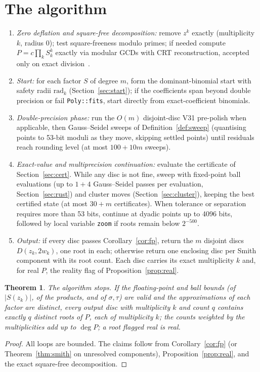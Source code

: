 \documentclass[10pt,a4paper]{article}
\newtheorem{theorem}{Theorem}[section]
\theoremstyle{definition}
\numberwithin{equation}{section}
\begin{document}
\section{The algorithm}\label{sec:algo}
\begin{enumerate}
\item \emph{Zero deflation and square-free decomposition:} remove $z^k$ exactly (multiplicity $k$, radius $0$); test square-freeness modulo primes; if needed compute $P=c\prod_k S_k^k$ exactly via modular GCDs with CRT reconstruction, accepted only on exact division~\cite{g5,g6}.
\item \emph{Start:} for each factor $S$ of degree $m$, form the dominant-binomial start with safety radii $\mathrm{rad}_k$ (Section~\ref{sec:start}); if the coefficients span beyond double precision or fail \texttt{Poly::fits}, start directly from exact-coefficient binomials.
\item \emph{Double-precision phase:} run the $O(m)$ disjoint-disc V31 pre-polish when applicable, then Gauss--Seidel sweeps of Definition~\ref{def:sweep} (quantising points to 53-bit moduli as they move, skipping settled points) until residuals reach rounding level (at most $100+10m$ sweeps).
\item \emph{Exact-value and multiprecision continuation:} evaluate the certificate of Section~\ref{sec:cert}. While any disc is not fine, sweep with fixed-point ball evaluations (up to $1+4$ Gauss--Seidel passes per evaluation, Section~\ref{sec:rust}) and cluster moves (Section~\ref{sec:cluster}), keeping the best certified state (at most $30+m$ certificates). When tolerance or separation requires more than 53 bits, continue at dyadic points up to 4096 bits, followed by local variable \texttt{zoom} if roots remain below $2^{-500}$.
\item \emph{Output:} if every disc passes Corollary~\ref{cor:fp}, return the $m$ disjoint discs $D(z_k,2w_k)$, one root in each; otherwise return one enclosing disc per Smith component with its root count. Each disc carries its exact multiplicity $k$ and, for real $P$, the reality flag of Proposition~\ref{prop:real}.
\end{enumerate}

\begin{theorem}\label{thm:g8}
The algorithm stops. If the floating-point and ball bounds (of $|S(z_k)|$, of the products, and of $\sigma,\tau$) are valid and the approximations of each factor are distinct, every output disc with multiplicity $k$ and count $q$ contains exactly $q$ distinct roots of $P$, each of multiplicity $k$; the counts weighted by the multiplicities add up to $\deg P$; a root flagged real is real.
\end{theorem}
\begin{proof}
All loops are bounded. The claims follow from Corollary~\ref{cor:fp} (or Theorem~\ref{thm:smith} on unresolved components), Proposition~\ref{prop:real}, and the exact square-free decomposition.
\end{proof}
\end{document}
